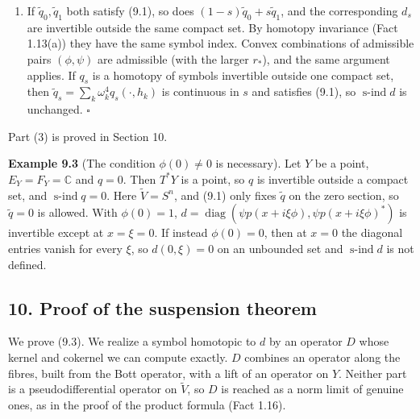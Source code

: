 \documentclass[
  11pt,
]{article}
\providecommand{\tightlist}{%
  \setlength{\itemsep}{0pt}\setlength{\parskip}{0pt}}
\begin{document}
\begin{enumerate}
\def\labelenumi{(\arabic{enumi})}
\setcounter{enumi}{1}
\tightlist
\item
  If \(\tilde q_0,\tilde q_1\) both satisfy (9.1), so does
  \((1-s)\tilde q_0+s\tilde q_1\), and the corresponding \(d_s\) are
  invertible outside the same compact set. By homotopy invariance (Fact
  1.13(a)) they have the same symbol index. Convex combinations of
  admissible pairs \((\phi,\psi)\) are admissible (with the larger
  \(r_*\)), and the same argument applies. If \(q_s\) is a homotopy of
  symbols invertible outside one compact set, then
  \(\tilde q_s=\sum_k\omega_k^4q_s(\cdot,h_k)\) is continuous in \(s\)
  and satisfies (9.1), so \(\operatorname{s-ind}d\) is unchanged.
  \(\square\)
\end{enumerate}

Part (3) is proved in Section 10.

\textbf{Example 9.3} (The condition \(\phi(0)\ne0\) is necessary). Let
\(Y\) be a point, \(E_Y=F_Y=\mathbb C\) and \(q=0\). Then \(T^*Y\) is a
point, so \(q\) is invertible outside a compact set, and
\(\operatorname{s-ind}q=0\). Here \(\tilde V=S^n\), and (9.1) only fixes
\(\tilde q\) on the zero section, so \(\tilde q=0\) is allowed. With
\(\phi(0)=1\),
\(d=\operatorname{diag}(\psi p(x+i\xi\phi),\psi p(x+i\xi\phi)^*)\) is
invertible except at \(x=\xi=0\). If instead \(\phi(0)=0\), then at
\(x=0\) the diagonal entries vanish for every \(\xi\), so \(d(0,\xi)=0\)
on an unbounded set and \(\operatorname{s-ind}d\) is not defined.

\subsection{10. Proof of the suspension
theorem}\label{proof-of-the-suspension-theorem}

We prove (9.3). We realize a symbol homotopic to \(d\) by an operator
\(D\) whose kernel and cokernel we can compute exactly. \(D\) combines
an operator along the fibres, built from the Bott operator, with a lift
of an operator on \(Y\). Neither part is a pseudodifferential operator
on \(\tilde V\), so \(D\) is reached as a norm limit of genuine ones, as
in the proof of the product formula (Fact 1.16).
\end{document}
